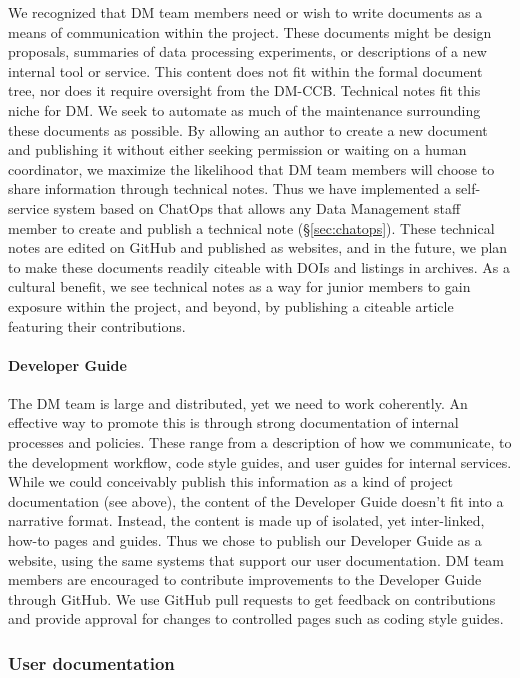We recognized that DM team members need or wish  to write documents as a means of communication within the project.
These documents might be design proposals, summaries of data processing experiments, or descriptions of a new internal tool or service.
This content does not fit within the formal document tree, nor does it require oversight from the DM-CCB.
Technical notes fit this niche for DM.
We seek to automate as much of the maintenance surrounding these documents as possible.
By allowing an author to create a new document and publishing it without either seeking permission or waiting on a human coordinator, we maximize the likelihood that DM team members will choose to share information through technical notes.
Thus we have implemented a self-service system based on ChatOps that allows any Data Management staff member to create and publish a technical note (\S\ref{sec:chatops}).
These technical notes are edited on GitHub and published as websites, and in the future, we plan to make these documents readily citeable with DOIs and listings in archives.
As a cultural benefit, we see technical notes as a way for junior members to gain exposure within the project, and beyond, by publishing a citeable article featuring their contributions.

\paragraph{Developer Guide}

The DM team is large and distributed, yet we need to work coherently.
An effective way to promote this is through strong documentation of internal processes and policies.
These range from a description of how we communicate, to the development workflow, code style guides, and user guides for internal services.
While we could conceivably publish this information as a kind of project documentation (see above), the content of the Developer Guide doesn't fit into a narrative format.
Instead, the content is made up of isolated, yet inter-linked, how-to pages and guides.
Thus we chose to publish our Developer Guide as a website,\cite{devguide} using the same systems that support our user documentation.
DM team members are encouraged to contribute improvements to the Developer Guide through GitHub.
We use GitHub pull requests to get feedback on contributions and provide approval for changes to controlled pages such as coding style guides.

\subsubsection{User documentation}
\label{sec:user_docs}

